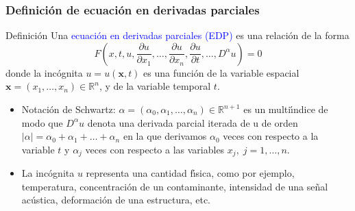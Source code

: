 \documentclass[compress]{beamer}
\def\R{\mathbb{R}}
\begin{document}

\begin{frame}
\frametitle{Definici\'on de ecuaci\'on en derivadas parciales}
\small
\vspace{-0.2cm}
\begin{block}{Definici\'on}{
Una \textcolor{blue}{ecuaci\'on en derivadas parciales (EDP)} es una relaci\'on de la forma
\[
F(x,t,u,\frac{\partial u}{\partial x_1},\ldots,\frac{\partial u}{\partial x_n},\frac{\partial u}{\partial t}, \ldots, D^{\alpha} u) = 0
\]
}
donde la inc\'ognita $u=u({\mathbf x},t)$ es una funci\'on de la variable espacial ${\mathbf x}=(x_1, \ldots, x_n) \in \R^n$, y de
la variable temporal $t$.
\end{block}
\begin{itemize}
\item \textcolor{azul}{Notaci\'on de Schwartz}: $\alpha=(\alpha_0,\alpha_1, \ldots, \alpha_n) \in \R^{n+1}$ es un multi\'{\i}ndice de modo que \textcolor{azul}{$D^{\alpha} u$} denota una \textcolor{azul}{derivada parcial iterada} de u de orden $|\alpha| = \alpha_0+\alpha_1+ \ldots+\alpha_n$ en la que derivamos $\alpha_0$ veces con respecto a la variable $t$ y $\alpha_j$ veces con respecto a las variables $x_j, \;j = 1, \ldots, n.$
\item La inc\'{o}gnita \textcolor{azul}{$u$ representa una cantidad f\'{\i}sica}, como por ejemplo, temperatura, concentraci\'on de un contaminante, intensidad de una se\~{n}al ac\'ustica, deformaci\'on de una estructura, etc.
\end{itemize}
\end{frame}

\end{document}
